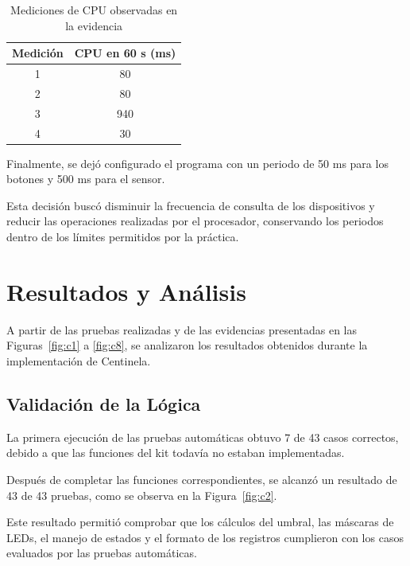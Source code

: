 \documentclass[conference]{IEEEtran}
\begin{document}
\begin{table}[H]
    \centering
    \caption{Mediciones de CPU observadas en la evidencia}
    \label{tab:cpu}
    \scriptsize
    \begin{tabular}{|c|c|}
        \hline
        \textbf{Medición} &
        \textbf{CPU en 60 s (ms)} \\
        \hline
        1 & 80 \\
        \hline
        2 & 80 \\
        \hline
        3 & 940 \\
        \hline
        4 & 30 \\
        \hline
    \end{tabular}
\end{table}

Finalmente, se dejó configurado el programa con un periodo de 50 ms para los botones y 500 ms para el sensor.

Esta decisión buscó disminuir la frecuencia de consulta de los dispositivos y reducir las operaciones realizadas por el procesador, conservando los periodos dentro de los límites permitidos por la práctica.


\section{Resultados y Análisis}

A partir de las pruebas realizadas y de las evidencias presentadas en las Figuras~\ref{fig:c1} a \ref{fig:c8}, se analizaron los resultados obtenidos durante la implementación de Centinela.

\subsection{Validación de la Lógica}

La primera ejecución de las pruebas automáticas obtuvo 7 de 43 casos correctos, debido a que las funciones del kit todavía no estaban implementadas.

Después de completar las funciones correspondientes, se alcanzó un resultado de 43 de 43 pruebas, como se observa en la Figura~\ref{fig:c2}.

Este resultado permitió comprobar que los cálculos del umbral, las máscaras de LEDs, el manejo de estados y el formato de los registros cumplieron con los casos evaluados por las pruebas automáticas.
\end{document}
